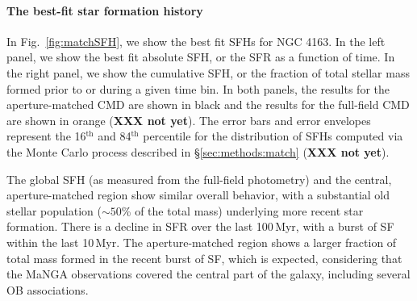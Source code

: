 \documentclass[preprint2]{aastex62}
\newcommand{\Myr}{$\,$Myr\xspace}
\begin{document}
\paragraph{The best-fit star formation history}

In Fig.~\ref{fig:matchSFH}, we show the best fit SFHs for NGC 4163. In the left panel, we show the best fit absolute SFH, or the SFR as a function of time. In the right panel, we show the cumulative SFH, or the fraction of total stellar mass formed prior to or during a given time bin. In both panels, the results for the aperture-matched CMD are shown in black and the results for the full-field CMD are shown in orange (\textbf{XXX not yet}). The error bars and error envelopes represent the 16$^{\mathrm{th}}$ and 84$^{\mathrm{th}}$ percentile for the distribution of SFHs computed via the Monte Carlo process described in \S\ref{sec:methods:match} (\textbf{XXX not yet}).

The global SFH (as measured from the full-field photometry) and the central, aperture-matched region show similar overall behavior, with a substantial old stellar population (${\sim}50$\% of the total mass) underlying more recent star formation. There is a decline in SFR over the last 100\Myr, with a burst of SF within the last 10\Myr. The aperture-matched region shows a larger fraction of total mass formed in the recent burst of SF, which is expected, considering that the MaNGA observations covered the central part of the galaxy, including several OB associations.
\end{document}
